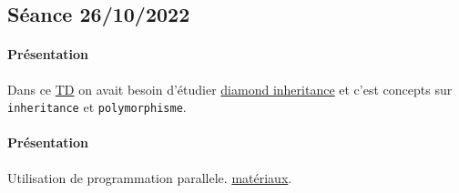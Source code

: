 \documentclass{article}
\begin{document}
\newpage\subsection{Séance 26/10/2022}
\paragraph{Présentation}Dans ce \href{https://perso.ensta-paris.fr/~bmonsuez/Cours/doku.php?id=in204:seances:seance8}{TD} on avait besoin d'étudier \href{https://stackoverflow.com/questions/2659116/how-does-virtual-inheritance-solve-the-diamond-multiple-inheritance-ambiguit}{diamond inheritance} et c'est concepts sur \texttt{inheritance} et \texttt{polymorphisme}.
\begin{scriptsize}\mycode
    
\end{scriptsize}
\paragraph{Présentation}Utilisation de programmation parallele. \href{https://github.com/JBL-Repo/IN204/blob/main/cours_recap.pdf}{matériaux}.
\begin{scriptsize}\mycode
    
\end{scriptsize}
\end{document}

